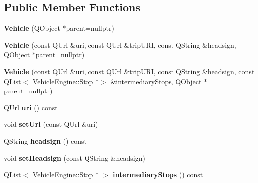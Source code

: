 \subsection*{Public Member Functions}
\begin{DoxyCompactItemize}
\item 
\mbox{\label{classVehicleEngine_1_1Vehicle_a208c46e84099d0f24ebcf699aedf9ca2}} 
{\bfseries Vehicle} (Q\+Object $\ast$parent=nullptr)
\item 
\mbox{\label{classVehicleEngine_1_1Vehicle_a637a49b74131270fdf0d73a6268e2716}} 
{\bfseries Vehicle} (const Q\+Url \&uri, const Q\+Url \&trip\+U\+RI, const Q\+String \&headsign, Q\+Object $\ast$parent=nullptr)
\item 
\mbox{\label{classVehicleEngine_1_1Vehicle_ac3b5f107da52e20512f9fca88a9ef3b3}} 
{\bfseries Vehicle} (const Q\+Url \&uri, const Q\+Url \&trip\+U\+RI, const Q\+String \&headsign, const Q\+List$<$ \mbox{\hyperlink{classVehicleEngine_1_1Stop}{Vehicle\+Engine\+::\+Stop}} $\ast$$>$ \&intermediary\+Stops, Q\+Object $\ast$parent=nullptr)
\item 
\mbox{\label{classVehicleEngine_1_1Vehicle_aa28bd729ce87ee0640c774f84a1ff93c}} 
Q\+Url {\bfseries uri} () const
\item 
\mbox{\label{classVehicleEngine_1_1Vehicle_a8196649a042f595230bb09b345d2ef18}} 
void {\bfseries set\+Uri} (const Q\+Url \&uri)
\item 
\mbox{\label{classVehicleEngine_1_1Vehicle_a4c9503af7c7b35d2d5cfbc20f8601209}} 
Q\+String {\bfseries headsign} () const
\item 
\mbox{\label{classVehicleEngine_1_1Vehicle_abaeb138ff93f006df951c6f2ca7e352a}} 
void {\bfseries set\+Headsign} (const Q\+String \&headsign)
\item 
\mbox{\label{classVehicleEngine_1_1Vehicle_a205ffe1cda249e0c888c9f925c6b7e9b}} 
Q\+List$<$ \mbox{\hyperlink{classVehicleEngine_1_1Stop}{Vehicle\+Engine\+::\+Stop}} $\ast$ $>$ {\bfseries intermediary\+Stops} () const
$$
\end{DoxyCompactItemize}
